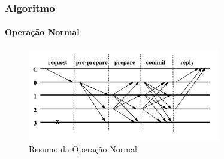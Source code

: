 \documentclass{beamer}
\begin{document}
\begin{frame}
  \frametitle{Algoritmo}
  \framesubtitle{Operação Normal}

  \begin{figure}
    \includegraphics[width=0.75\textwidth]{images/normal-case-op}
    \caption{Resumo da Operação Normal}
  \end{figure}
\end{frame}
\end{document}
